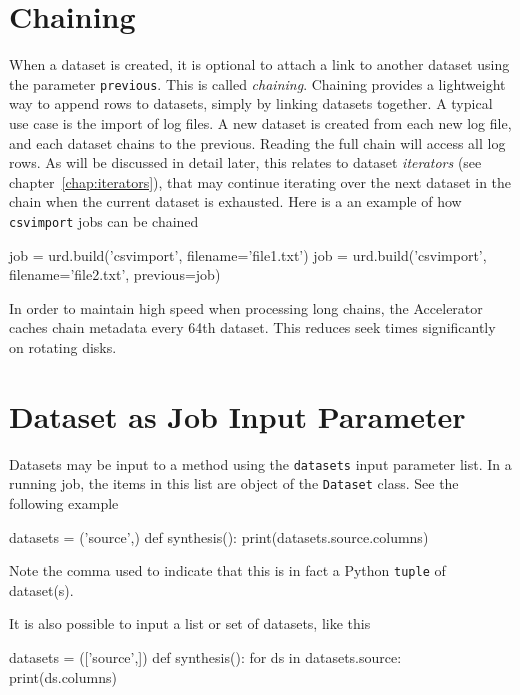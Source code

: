 \section{Chaining}
When a dataset is created, it is optional to attach a link to another
dataset using the parameter \texttt{previous}.  This is called
\emph{chaining}.  Chaining provides a lightweight way to append rows
to datasets, simply by linking datasets together.  A typical use case
is the import of log files.  A new dataset is created from each new
log file, and each dataset chains to the previous.  Reading the full
chain will access all log rows.  As will be discussed in detail later,
this relates to dataset \emph{iterators} (see
chapter~\ref{chap:iterators}), that may continue iterating over the
next dataset in the chain when the current dataset is exhausted.  Here
is a an example of how \texttt{csvimport} jobs can be chained
\begin{python}
job = urd.build('csvimport', filename='file1.txt')
job = urd.build('csvimport', filename='file2.txt', previous=job)
\end{python}
In order to maintain high speed when processing long chains, the
Accelerator caches chain metadata every 64th dataset.  This reduces
seek times significantly on rotating disks.



\section{Dataset as Job Input Parameter}
Datasets may be input to a method using the \texttt{datasets} input
parameter list.  In a running job, the items in this list are object
of the \texttt{Dataset} class.  See the following example
\begin{python}
datasets = ('source',)
def synthesis():
    print(datasets.source.columns)
\end{python}
Note the comma used to indicate that this is in fact a
Python \texttt{tuple} of dataset(s).

It is also possible to input a list or set of datasets, like this
\begin{python}
datasets = (['source',])
def synthesis():
    for ds in datasets.source:
        print(ds.columns)
\end{python}



